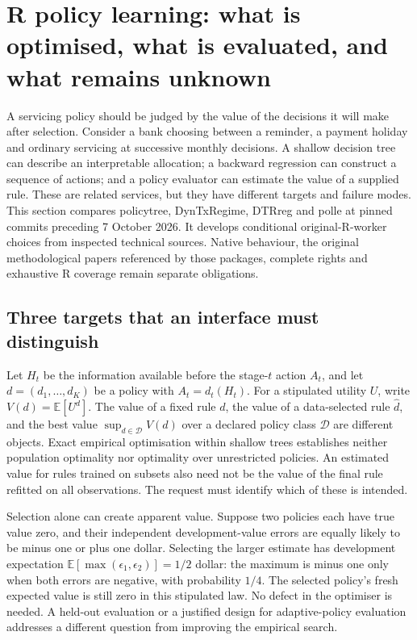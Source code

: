 \label{exec15:d3rlpy-contract-end}


\section{R policy learning: what is optimised, what is evaluated, and what remains unknown}
\label{sec:exec24-policies-r}

A servicing policy should be judged by the value of the decisions it will make after selection.
Consider a bank choosing between a reminder, a payment holiday and ordinary servicing at
successive monthly decisions. A shallow decision tree can describe an interpretable allocation;
a backward regression can construct a sequence of actions; and a policy evaluator can estimate
the value of a supplied rule. These are related services, but they have different targets and
failure modes. This section compares policytree, DynTxRegime, DTRreg and polle at pinned
commits preceding 7 October 2026. It develops conditional original-R-worker choices from
inspected technical sources. Native behaviour, the original methodological papers referenced
by those packages, complete rights and exhaustive R coverage remain separate obligations.

\subsection{Three targets that an interface must distinguish}
Let $H_t$ be the information available before the stage-$t$ action $A_t$, and let
$d=(d_1,\ldots,d_K)$ be a policy with $A_t=d_t(H_t)$. For a stipulated utility $U$,
write $V(d)=\mathbb E[U^d]$. The value of a fixed rule $d$, the value of a
data-selected rule $\widehat d$, and the best value
$\sup_{d\in\mathcal D}V(d)$ over a declared policy class $\mathcal D$ are different
objects. Exact empirical optimisation within shallow trees establishes neither
population optimality nor optimality over unrestricted policies. An estimated value
for rules trained on subsets also need not be the value of the final rule refitted
on all observations. The request must identify which of these is intended.

Selection alone can create apparent value. Suppose two policies each have true value
zero, and their independent development-value errors are equally likely to be minus
one or plus one dollar. Selecting the larger estimate has development expectation
$\mathbb E[\max(\epsilon_1,\epsilon_2)]=1/2$ dollar: the maximum is minus one
only when both errors are negative, with probability $1/4$. The selected policy's
fresh expected value is still zero in this stipulated law. No defect in the optimiser
is needed. A held-out evaluation or a justified design for adaptive-policy evaluation
addresses a different question from improving the empirical search.
\citep{exec24_policiesr_reference}

